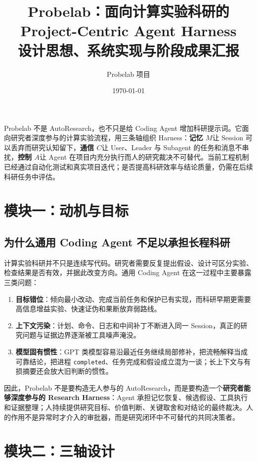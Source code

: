 \documentclass[UTF8,11pt,a4paper,fontset=fandol]{ctexart}
\title{\bfseries Probelab：面向计算实验科研的\\Project-Centric Agent Harness\\\large 设计思想、系统实现与阶段成果汇报}
\author{Probelab 项目}
\date{\today}
\newcommand{\code}[1]{\texttt{#1}}
\newcommand{\term}[1]{\textbf{#1}}
\begin{document}
\maketitle

\begin{resultbox}[结论先行]
Probelab 不是 AutoResearch，也不只是给 Coding Agent 增加科研提示词。它面向研究者深度参与的计算实验流程，用三条轴组织 Harness：\term{记忆 $M$}让 Session 可以丢弃而研究认知留下，\term{通信 $C$}让 User、Leader 与 Subagent 的任务和消息不串扰，\term{控制 $A$}让 Agent 在项目内充分执行而人的研究裁决不可替代。当前工程机制已经通过自动化测试和真实项目迭代；是否提高科研效率与结论质量，仍需在后续科研任务中评估。
\end{resultbox}

\setcounter{tocdepth}{2}
\tableofcontents
\newpage

\section{模块一：动机与目标}

\subsection{为什么通用 Coding Agent 不足以承担长程科研}

计算实验科研并不只是连续写代码。研究者需要反复提出假设、设计可区分实验、检查结果是否有效，并据此改变方向。通用 Coding Agent 在这一过程中主要暴露三类问题：

\begin{enumerate}
  \item \term{目标错位}：倾向最小改动、完成当前任务和保护已有实现，而科研早期更需要高信息增益实验、快速证伪和果断放弃弱路线。
  \item \term{上下文污染}：计划、命令、日志和中间补丁不断进入同一 Session，真正的研究问题与证据边界逐渐被工具噪声淹没。
  \item \term{模型固有惯性}：GPT 类模型容易沿最近任务继续局部修补，把流畅解释当成可靠结论，把进程 \code{completed}、任务完成和假设成立混为一谈；长上下文与有损摘要还会放大旧判断的惯性。
\end{enumerate}

因此，Probelab 不是要构造无人参与的 AutoResearch，而是要构造一个\term{研究者能够深度参与的 Research Harness}：Agent 承担记忆恢复、候选假设、工具执行和证据整理；人持续提供研究目标、价值判断、关键取舍和对结论的最终裁决。人的作用不是异常时才介入的审批器，而是研究闭环中不可替代的共同决策者。

\section{模块二：三轴设计}
\end{document}

